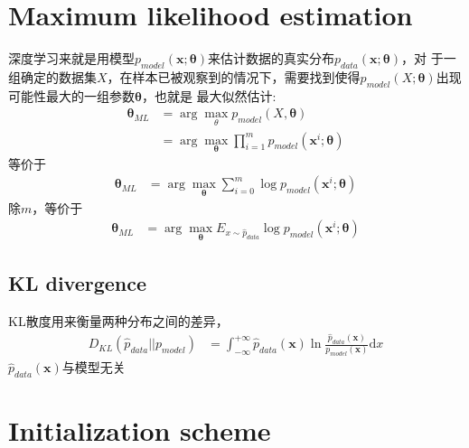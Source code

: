 \section{Maximum likelihood estimation}
深度学习来就是用模型$p_{model}(\boldsymbol{x};\boldsymbol{\theta})$来估计数据的真实分布$p_{data}(\boldsymbol{x};\boldsymbol{\theta})$，对
于一组确定的数据集$X$，在样本已被观察到的情况下，需要找到使得$p_{model}(X; \boldsymbol{\theta})$出现可能性最大的一组参数$\boldsymbol{\theta}$，也就是
最大似然估计:
\begin{equation}
    \begin{split}
        \boldsymbol{\theta}_{ML} &= \arg \max_\theta p_{model}(X, \boldsymbol{\theta}) \\
        &= \arg \max_{\boldsymbol{\theta}} \prod _{i=1}^m p_{model}(\boldsymbol{x}^i; \boldsymbol{\theta})
    \end{split}
\end{equation}
等价于
\begin{equation}
    \begin{split}
        \boldsymbol{\theta}_{ML} &= \arg \max_{\boldsymbol{\theta}} \sum_{i=0}^m \log p_{model}(\boldsymbol{x}^i; \boldsymbol{\theta})
    \end{split}
\end{equation}
除$m$，等价于
\begin{equation}
    \begin{split}
        \boldsymbol{\theta}_{ML} &= \arg \max_{\boldsymbol{\theta}} E _{x \sim \hat p_{data}} \log p_{model}(\boldsymbol{x}^i; \boldsymbol{\theta})
    \end{split}
\end{equation}

\subsection{KL divergence}
KL散度用来衡量两种分布之间的差异，
\begin{equation}
    \begin{split}
        D_{KL}(\hat p_{data}|| p_{model}) &= \int_{-\infty}^{+\infty} \hat p_{data}(\boldsymbol{x}) \ln{\frac{\hat p_{data}(\boldsymbol{x})}{p_{model}(\boldsymbol{x})}} \mathrm{d}x
    \end{split}
\end{equation}
$\hat p_{data}(\boldsymbol{x})$与模型无关

\section{Initialization scheme}
